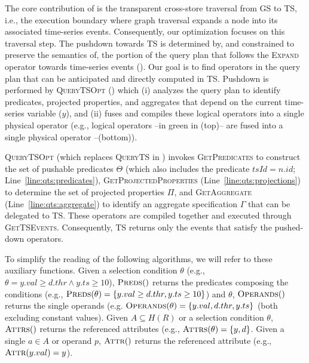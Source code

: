 The core contribution of \ourapproach is the transparent cross-store traversal from GS to TS, i.e., the execution boundary where graph traversal expands a node into its associated time-series events.
Consequently, our optimization focuses on this traversal step.
The pushdown towards TS is determined by, and constrained to preserve the semantics of, the portion of the query plan that follows the \textsc{Expand} operator towards time-series events ().
Our goal is to find operators in the query plan that can be anticipated and directly computed in TS.
Pushdown is performed by \textsc{QueryTSOpt} () which (i) analyzes the query plan to identify predicates, projected properties, and aggregates that depend on the current time-series variable ($y$), and (ii) fuses and compiles these logical operators into a single physical operator \cite{DBLP:conf/icde/KemperN11,DBLP:conf/cidr/ElgamalLBETRS17} (e.g., logical operators --in green in (top)-- are fused into a single physical operator --(bottom)).

\textsc{QueryTSOpt} (which replaces \textsc{QueryTS} in ) invokes \textsc{GetPredicates} to construct the set of pushable predicates $\Theta$ (which also includes the predicate $tsId=n.id$; Line~\ref{line:qts:predicates}), \textsc{GetProjectedProperties} (Line~\ref{line:qts:projections}) to determine the set of projected properties $\Pi$, and \textsc{GetAggregate} (Line~\ref{line:qts:aggregate}) to identify an aggregate specification $\Gamma$ that can be delegated to TS.
These operators are compiled together and executed through \textsc{GetTSEvents}.
Consequently, TS returns only the events that satisfy the pushed-down operators.

To simplify the reading of the following algorithms, we will refer to these auxiliary functions.
Given a selection condition $\theta$ (e.g., $\theta = y.val \ge d.thr \land y.ts \ge 10$), $\textsc{Preds}()$ returns the predicates composing the conditions (e.g., $\textsc{Preds}(\theta)=\{y.val \ge d.thr, y.ts \ge 10 \}$) and $\theta$, $\textsc{Operands}()$ returns the single operands (e.g. $\textsc{Operands}(\theta)=\{y.val, d.thr, y.ts\}$ (both excluding constant values).
Given $A \subseteq H(R)$ or a selection condition $\theta$, $\textsc{Attrs}()$ returns the referenced attributes (e.g., $\textsc{Attrs}(\theta)=\{y,d \}$.
Given a single $a \in A$ or operand $p$, $\textsc{Attr}()$ returns the referenced attribute (e.g., $\textsc{Attr}(y.val)=y$).

